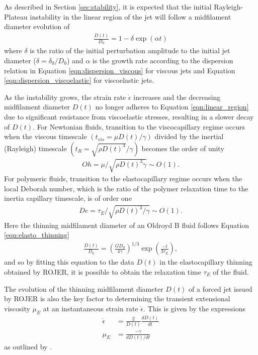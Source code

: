 \documentclass[11pt]{article}
\newcommand{\od}[2]{\frac{d #1}{d #2}}
\begin{document}
As described in Section \ref{sec:stability}, it is expected that the initial 
Rayleigh-Plateau instability in the linear region of the jet will follow a 
midfilament diameter evolution of
\begin{align}
\frac{D(t)}{D_0} = 1 - \delta \exp (\alpha t)
\label{eqn:linear_region}
\end{align}
where $\delta$ is the ratio of the initial perturbation amplitude to the 
initial jet diameter ($\delta = \delta_0 / D_0$) and $\alpha$ is the growth 
rate according to the dispersion relation in Equation \ref{eqn:dispersion_viscous} 
for viscous jets and Equation \ref{eqn:dispersion_viscoelastic} for viscoelastic 
jets.

As the instability grows, the strain rate $\dot{\epsilon}$ increases and the 
decreasing midfilament diameter $D(t)$ no longer adheres to Equation 
\ref{eqn:linear_region} due to significant resistance from viscoelastic 
stresses, resulting in a slower decay of $D(t)$. For Newtonian fluids, 
transition to the viscocapillary regime occurs when the viscous timescale 
$\left(t_{vis} = \mu D(t) /\gamma \right)$ divided by the inertial (Rayleigh) 
timescale $\left(t_R = \sqrt{\rho D(t)^3}/\gamma \right)$ becomes the order of 
unity \citep{clasen2012dispensing}
\begin{align*}
Oh = \mu/\sqrt{\rho D(t)^3 \gamma} \sim O(1).
\end{align*}
For polymeric fluids, transition to the elastocapillary regime occurs when the 
local Deborah number, which is the ratio of the polymer relaxation time to the 
inertia capillary timescale, is of order one 
\begin{align*}
De = \tau_E / \sqrt{\rho D(t)^3/\gamma} \sim O(1).
\end{align*}
Here the thinning midfilament diameter of an Oldroyd B fluid follows Equation 
\ref{eqn:elasto_thinning}
\begin{align}
\frac{D(t)}{D_0} = \left(\frac{G D_0}{4 \gamma}\right)^{1/3} \exp 
\left(\frac{-t}{3 \tau_E}\right),
\label{eqn:elasto_thinning4}
\end{align}
and so by fitting this equation to the data $D(t)$ in the elastocapillary 
thinning obtained by ROJER, it is possible to obtain the relaxation time 
$\tau_E$ of the fluid.

The evolution of the thinning midfilament diameter $D(t)$ of a forced jet 
issued by ROJER is also the key factor to determining the transient extensional 
viscosity $\mu_E$ at an instantaneous strain rate $\dot{\epsilon}$. This is 
given by the expressions
\begin{align}
\dot{\epsilon} &= \frac{2}{D(t)} \od{D(t)}{t} \label{eqn:strain_rate} \\
\mu_E &= \frac{- \gamma}{d D(t) / dt} \label{eqn:ext_viscosity}
\end{align}
as outlined by \cite{anna2001elasto}.
\end{document}
